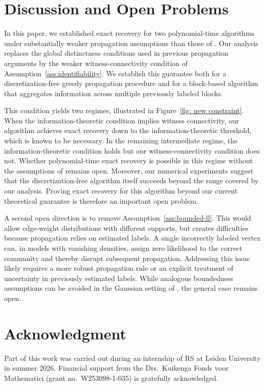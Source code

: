 \documentclass[11pt, a4paper]{amsart}
\newcommand{\1}{\mathbf{1}}
\theoremstyle{definition}
\theoremstyle{remark}
\theoremstyle{definition}
\begin{document}
\section{Discussion and Open Problems}

In this paper, we established exact recovery for two polynomial-time
algorithms under substantially weaker propagation assumptions than those
of \cite{gaudio2026jan}. Our analysis replaces the global distinctness
conditions used in previous propagation arguments by the weaker
witness-connectivity condition of Assumption~\ref{ass:identifiability}.
We establish this guarantee both for a discretization-free greedy
propagation procedure and for a block-based algorithm that aggregates
information across multiple previously labeled blocks.

This condition yields two regimes, illustrated in Figure~\ref{fig: new constraint}. When the information-theoretic condition implies witness connectivity, our algorithm achieves exact recovery down to the information-theoretic threshold, which is known to be necessary. In the remaining intermediate regime, the information-theoretic condition holds but our witness-connectivity condition does not. Whether polynomial-time exact recovery is possible in this regime without the assumptions of \cite{gaudio2026jan} remains open. Moreover, our numerical experiments suggest that the discretization-free algorithm itself succeeds beyond the range covered by our analysis. Proving exact recovery for this algorithm beyond our current theoretical guarantee is therefore an important open problem.

A second open direction is to remove Assumption~\ref{ass:bounded-ll}. This would allow edge-weight distributions with different supports, but creates difficulties because propagation relies on estimated labels. A single incorrectly labeled vertex can, in models with vanishing densities, assign zero likelihood to the correct community and thereby disrupt subsequent propagation. Addressing this issue likely requires a more robust propagation rule or an explicit treatment of uncertainty in previously estimated labels. While analogous boundedness assumptions can be avoided in the Gaussian setting of \cite{gaudio2025incguan}, the general case remains open.

\section*{Acknowledgment}
Part of this work was carried out during an internship of RS at Leiden University in summer 2026. Financial support from the Drs.~Kuikenga Fonds voor Mathematici (grant no.~W253098-1-035) is gratefully acknowledged.
\end{document}
